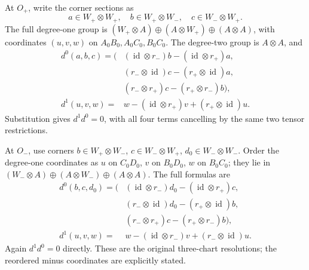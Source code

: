 At \(O_+\), write the corner sections as \[
a\in W_+\otimes W_+,\quad
b\in W_+\otimes W_-,\quad
c\in W_-\otimes W_+.
\] The full degree-one group is
\((W_+\otimes A)\oplus(A\otimes W_+)\oplus(A\otimes A)\), with
coordinates \((u,v,w)\) on \(A_0B_0,A_0C_0,B_0C_0\). The degree-two
group is \(A\otimes A\), and \[
\begin{aligned}
d^0(a,b,c)=\bigl(&(\operatorname{id}\otimes r_-)b
                   -(\operatorname{id}\otimes r_+)a,\\
                &(r_-\otimes\operatorname{id})c
                   -(r_+\otimes\operatorname{id})a,\\
                &(r_-\otimes r_+)c-(r_+\otimes r_-)b\bigr),\\
d^1(u,v,w)={}&w-(\operatorname{id}\otimes r_+)v
                  +(r_+\otimes\operatorname{id})u.
\end{aligned}
\tag{DER7.3}
\] Substitution gives \(d^1d^0=0\), with all four terms cancelling by
the same two tensor restrictions.

At \(O_-\), use corners \(b\in W_+\otimes W_-\),
\(c\in W_-\otimes W_+\), \(d_0\in W_-\otimes W_-\). Order the degree-one
coordinates as \(u\) on \(C_0D_0\), \(v\) on \(B_0D_0\), \(w\) on
\(B_0C_0\); they lie in
\((W_-\otimes A)\oplus(A\otimes W_-)\oplus(A\otimes A)\). The full
formulas are \[
\begin{aligned}
d^0(b,c,d_0)=\bigl(&(\operatorname{id}\otimes r_-)d_0
                     -(\operatorname{id}\otimes r_+)c,\\
                 &(r_-\otimes\operatorname{id})d_0
                     -(r_+\otimes\operatorname{id})b,\\
                 &(r_-\otimes r_+)c-(r_+\otimes r_-)b\bigr),\\
d^1(u,v,w)={}&w-(\operatorname{id}\otimes r_-)v
                  +(r_-\otimes\operatorname{id})u .
\end{aligned}
\tag{DER7.4}
\] Again \(d^1d^0=0\) directly. These are the original three-chart
resolutions; the reordered minus coordinates are explicitly stated.

